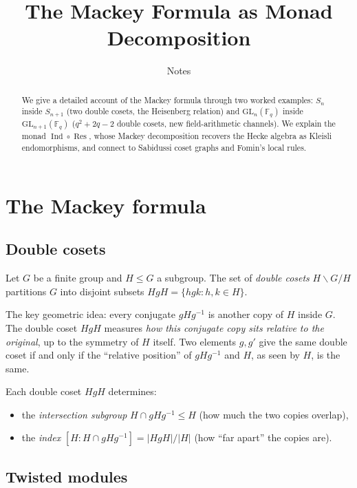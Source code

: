 \documentclass[12pt,a4paper]{article}
\title{The Mackey Formula as Monad Decomposition}
\author{Notes}
\date{}
\theoremstyle{definition}
\theoremstyle{remark}
\newcommand{\F}{\mathbb{F}}
\newcommand{\Ind}{\operatorname{Ind}}
\newcommand{\Res}{\operatorname{Res}}
\newcommand{\GL}{\mathrm{GL}}
\begin{document}
\maketitle

\begin{abstract}
We give a detailed account of the Mackey formula through two worked
examples: $S_n$ inside $S_{n+1}$ (two double cosets, the Heisenberg
relation) and $\GL_n(\F_q)$ inside $\GL_{n+1}(\F_q)$ ($q^2+2q-2$
double cosets, new field-arithmetic channels). We explain the
monad $\Ind \circ \Res$, whose Mackey decomposition recovers the
Hecke algebra as Kleisli endomorphisms, and connect to Sabidussi
coset graphs and Fomin's local rules.
\end{abstract}

\tableofcontents

\section{The Mackey formula}
\label{sec:mackey}

\subsection{Double cosets}

Let $G$ be a finite group and $H \leqslant G$ a subgroup. The set of
\emph{double cosets} $H \backslash G / H$ partitions $G$ into disjoint
subsets $HgH = \{hgk : h, k \in H\}$.

The key geometric idea: every conjugate $gHg^{-1}$ is another copy of
$H$ inside $G$. The double coset $HgH$ measures \emph{how this
conjugate copy sits relative to the original}, up to the symmetry of
$H$ itself. Two elements $g, g'$ give the same double coset if and
only if the ``relative position'' of $gHg^{-1}$ and $H$, as seen by
$H$, is the same.

Each double coset $HgH$ determines:
\begin{itemize}
\item the \emph{intersection subgroup} $H \cap gHg^{-1} \leqslant H$
  (how much the two copies overlap),
\item the \emph{index} $[H : H \cap gHg^{-1}] = |HgH|/|H|$
  (how ``far apart'' the copies are).
\end{itemize}

\subsection{Twisted modules}
\end{document}
